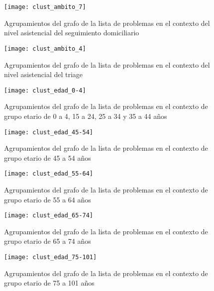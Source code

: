 \begin{figure}[ht]
\caption{Agrupamientos del grafo de la lista de problemas en el contexto del nivel asistencial del seguimiento domiciliario }
\label{fig:clust_ambito_segui_domici}
\centering
\texttt{[image: clust\_ambito\_7]}
\end{figure}

\begin{figure}[ht]
\caption{Agrupamientos del grafo de la lista de problemas en el contexto del nivel asistencial del triage }
\label{fig:clust_ambito_triage}
\centering
\texttt{[image: clust\_ambito\_4]}
\end{figure}

\begin{figure}[ht]
\caption{Agrupamientos del grafo de la lista de problemas en el contexto de grupo etario de 0 a 4, 15 a 24, 25 a 34 y 35 a 44 años }
\label{fig:clust_edad_0_4}
\centering
\texttt{[image: clust\_edad\_0-4]}
\end{figure}

\begin{figure}[ht]
\caption{Agrupamientos del grafo de la lista de problemas en el contexto de grupo etario de 45 a 54 años }
\label{fig:clust_edad_45_54}
\centering
\texttt{[image: clust\_edad\_45-54]}
\end{figure}

\begin{figure}[ht]
\caption{Agrupamientos del grafo de la lista de problemas en el contexto de grupo etario de 55 a 64 años }
\label{fig:clust_edad_55_64}
\centering
\texttt{[image: clust\_edad\_55-64]}
\end{figure}

\begin{figure}[ht]
\caption{Agrupamientos del grafo de la lista de problemas en el contexto de grupo etario de 65 a 74 años }
\label{fig:clust_edad_65_74}
\centering
\texttt{[image: clust\_edad\_65-74]}
\end{figure}

\begin{figure}[ht]
\caption{Agrupamientos del grafo de la lista de problemas en el contexto de grupo etario de 75 a 101 años }
\label{fig:clust_edad_75_101}
\centering
\texttt{[image: clust\_edad\_75-101]}
\end{figure}
